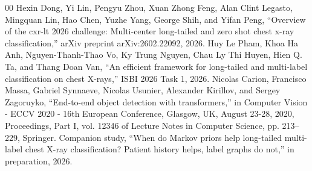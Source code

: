 \documentclass[conference]{IEEEtran}
\begin{document}
\begin{thebibliography}{00}
 Hexin Dong, Yi Lin, Pengyu Zhou, Xuan Zhong Feng, Alan Clint Legasto, Mingquan Lin, Hao Chen, Yuzhe Yang, George Shih, and Yifan Peng, ``Overview of the cxr-lt 2026 challenge: Multi-center long-tailed and zero shot chest x-ray classification,'' arXiv preprint arXiv:2602.22092, 2026.
 Huy Le Pham, Khoa Ha Anh, Nguyen-Thanh-Thao Vo, Ky Trung Nguyen, Chau Ly Thi Huyen, Hien Q. Ta, and Thang Doan Van, ``An efficient framework for long-tailed and multi-label classification on chest X-rays,'' ISBI 2026 Task 1, 2026.
 Nicolas Carion, Francisco Massa, Gabriel Synnaeve, Nicolas Usunier, Alexander Kirillov, and Sergey Zagoruyko, ``End-to-end object detection with transformers,'' in Computer Vision - ECCV 2020 - 16th European Conference, Glasgow, UK, August 23-28, 2020, Proceedings, Part I, vol. 12346 of Lecture Notes in Computer Science, pp. 213--229, Springer.
 Companion study, ``When do Markov priors help long-tailed multi-label chest X-ray classification? Patient history helps, label graphs do not,'' in preparation, 2026.
\end{thebibliography}
\end{document}
